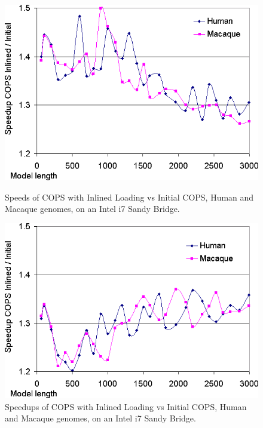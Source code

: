 \begin{figure}[H]
    \begin{minipage}{0.48\linewidth}
		\centering
		\includegraphics[scale=0.48]{graphics/inlined-cmp-larissa.png}
		\caption[Speedups of Inlined COPS vs Initial COPS on an Intel i7 Sandy Bridge] 
		{Speeds of COPS with Inlined Loading vs Initial COPS, Human and Macaque genomes, on an Intel i7 Sandy Bridge.}
		\label{inlined-cmp-larissa}
    \end{minipage}
    \hspace{0.04\linewidth}
    \begin{minipage}{0.48\linewidth}
		\centering
		\includegraphics[scale=0.48]{graphics/inlined-cmp-tags.png}
		\caption[Speedups of Inlined COPS vs Initial COPS on an Intel i7 Sandy Bridge]
		{Speedups of COPS with Inlined Loading vs Initial COPS, Human and Macaque genomes, on an Intel i7 Sandy Bridge.}
		\label{inlined-cmp-tags}
    \end{minipage}
\end{figure} 





